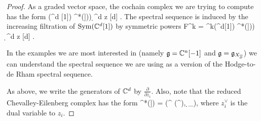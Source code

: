 \documentclass[10pt]{amsart}
\begin{document}
\begin{proof}
As a graded vector space, the cochain complex we are trying to compute has the form
\ben
\Sym(\CC^d [1]) \tensor \cred^*\left(\fg[[z_1,\ldots,z_d]])\right) \d^d z [d] .
\een
The spectral sequence is induced by the increasing filtration of ${\rm Sym}(\mathbb C^d [1])$ by symmetric powers
\ben
F^k = \Sym^{\leq k}(\CC^d[1]) \tensor \cred^*\left(\fg[[z_1,\ldots,z_d]])\right) \d^d z [d] .
\een

\begin{rmk}
In the examples we are most interested in (namely $\mathfrak g = \mathbb C^n[-1]$ and $\mathfrak g = \mathfrak g_{X_{\overline{\partial}}}$) we can understand the spectral sequence we are using as a version of the Hodge-to-de Rham spectral sequence.
\end{rmk}

As above, we write the generators of $\mathbb C^d$ by $\frac{\partial}{\partial z_i}$. 
Also, note that the reduced Chevalley-Eilenberg complex has the form
\ben
\cred^*(\fg[[z_1,\ldots,z_n]]) = \left(\Sym^{} \left(\fg^ \right), \d_{\fg}\right),
\een
where $z_i^\vee$ is the dual variable to $z_i$. 


\end{proof}
\end{document}

